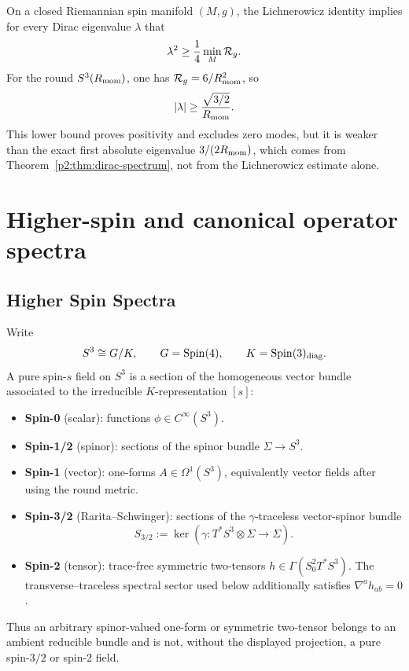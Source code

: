 \documentclass[12pt,a4paper]{article}
\begin{document}
\begin{remark}
On a closed Riemannian spin manifold \((M,g)\), the Lichnerowicz identity
implies for every Dirac eigenvalue \(\lambda\) that
\[
\lambda^2\ge\frac14\min_M\mathcal R_g.
\]
For the round \(S^3(R_{\mathrm{mom}})\), one has
\(\mathcal R_g=6/R_{\mathrm{mom}}^2\), so
\[
|\lambda|\ge\frac{\sqrt{3/2}}{R_{\mathrm{mom}}}.
\]
This lower bound proves positivity and excludes zero modes, but it is weaker
than the exact first absolute eigenvalue \(3/(2R_{\mathrm{mom}})\), which comes from
Theorem~\ref{p2:thm:dirac-spectrum}, not from the Lichnerowicz estimate alone.
\end{remark}


\section{Higher-spin and canonical operator spectra}
\label{paper2d:sec:organized-spin}

\subsection{Higher Spin Spectra}
\label{p2:sec:higher-spin}


\begin{definition}
\label{p2:def:spin-s-fields-s3}
Write
\[
S^3\cong G/K,
\qquad
G=\mathrm{Spin}(4),
\qquad
K=\mathrm{Spin}(3)_{\mathrm{diag}}.
\]
A pure spin-\(s\) field on \(S^3\) is a section of the homogeneous vector
bundle associated to the irreducible \(K\)-representation \([s]\):
\begin{itemize}
    \item \textbf{Spin-0} (scalar): functions
    \(\phi\in C^\infty(S^3)\).
    \item \textbf{Spin-1/2} (spinor): sections of the spinor bundle
    \(\Sigma\to S^3\).
    \item \textbf{Spin-1} (vector): one-forms
    \(A\in\Omega^1(S^3)\), equivalently vector fields after using the
    round metric.
    \item \textbf{Spin-3/2} (Rarita--Schwinger): sections of the
    \(\gamma\)-traceless vector-spinor bundle
    \[
      S_{3/2}
      :=
      \ker\!\left(
        \gamma:T^*S^3\otimes\Sigma\longrightarrow\Sigma
      \right).
    \]
    \item \textbf{Spin-2} (tensor): trace-free symmetric two-tensors
    \(h\in\Gamma(S^2_0T^*S^3)\).  The transverse--traceless spectral
    sector used below additionally satisfies \(\nabla^a h_{ab}=0\).
\end{itemize}
Thus an arbitrary spinor-valued one-form or symmetric two-tensor belongs to
an ambient reducible bundle and is not, without the displayed projection, a
pure spin-\(3/2\) or spin-\(2\) field.
\end{definition}
\end{document}
